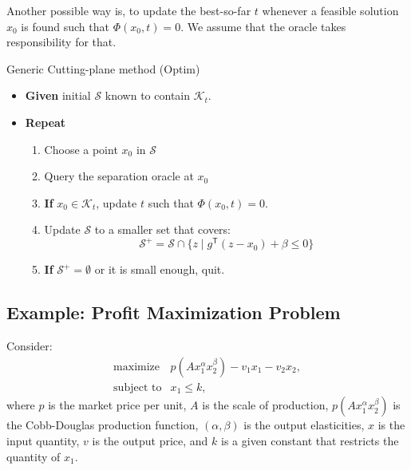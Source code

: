 \documentclass[final,leqno]{siamltex}
\providecommand{\tightlist}{%
  \setlength{\itemsep}{0pt}\setlength{\parskip}{0pt}}
\begin{document}
Another possible way is, to update the best-so-far \(t\) whenever a feasible solution \(x_0\) is found such that \(\Phi(x_0, t) = 0\). We assume that the oracle takes responsibility for that.

Generic Cutting-plane method (Optim)

\begin{itemize}
\tightlist
\item
  \textbf{Given} initial \(\mathcal{S}\) known to contain \(\mathcal{K}_t\).
\item
  \textbf{Repeat}

  \begin{enumerate}
  \def\labelenumi{\arabic{enumi}.}
  \tightlist
  \item
    Choose a point \(x_0\) in \(\mathcal{S}\)
  \item
    Query the separation oracle at \(x_0\)
  \item
    \textbf{If} \(x_0 \in \mathcal{K}_t\), update \(t\) such that
    \(\Phi(x_0, t) = 0\).
  \item
    Update \(\mathcal{S}\) to a smaller set that covers:
    \[\mathcal{S}^+ = \mathcal{S} \cap \{z \mid g^\mathsf{T} (z - x_0) + \beta \leq 0\} \]
  \item
    \textbf{If} \(\mathcal{S}^+ = \emptyset\) or it is small enough, quit.
  \end{enumerate}
\end{itemize}

\hypertarget{sec:example-profit-maximization-problem}{%
\subsection{Example: Profit Maximization Problem}\label{sec:example-profit-maximization-problem}}

Consider:
\begin{equation}\begin{array}{ll}
   \text{maximize} & p(A x_1^\alpha x_2^\beta) - v_1 x_1 - v_2 x_2, \\
   \text{subject to}& x_1 \le k,
  \end{array}
\label{eq:profit-max-in-original-form}\end{equation}
where
\(p\) is the market price per unit,
\(A\) is the scale of production,
\(p(A x_1^\alpha x_2^\beta)\) is the Cobb-Douglas production function,
\((\alpha, \beta)\) is the output elasticities,
\(x\) is the input quantity,
\(v\) is the output price, and
\(k\) is a given constant that restricts the quantity of \(x_1\).
\end{document}
